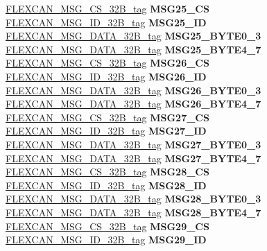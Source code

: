 \begin{DoxyCompactItemize}
\begin{tabbing}
\>\>\mbox{\hyperlink{unionFLEXCAN__MSG__CS__32B__tag}{FLEXCAN\_MSG\_CS\_32B\_tag}} {\bfseries MSG25\_CS}\\
\>\>\mbox{\hyperlink{unionFLEXCAN__MSG__ID__32B__tag}{FLEXCAN\_MSG\_ID\_32B\_tag}} {\bfseries MSG25\_ID}\\
\>\>\mbox{\hyperlink{unionFLEXCAN__MSG__DATA__32B__tag}{FLEXCAN\_MSG\_DATA\_32B\_tag}} {\bfseries MSG25\_BYTE0\_3}\\
\>\>\mbox{\hyperlink{unionFLEXCAN__MSG__DATA__32B__tag}{FLEXCAN\_MSG\_DATA\_32B\_tag}} {\bfseries MSG25\_BYTE4\_7}\\
\>\>\mbox{\hyperlink{unionFLEXCAN__MSG__CS__32B__tag}{FLEXCAN\_MSG\_CS\_32B\_tag}} {\bfseries MSG26\_CS}\\
\>\>\mbox{\hyperlink{unionFLEXCAN__MSG__ID__32B__tag}{FLEXCAN\_MSG\_ID\_32B\_tag}} {\bfseries MSG26\_ID}\\
\>\>\mbox{\hyperlink{unionFLEXCAN__MSG__DATA__32B__tag}{FLEXCAN\_MSG\_DATA\_32B\_tag}} {\bfseries MSG26\_BYTE0\_3}\\
\>\>\mbox{\hyperlink{unionFLEXCAN__MSG__DATA__32B__tag}{FLEXCAN\_MSG\_DATA\_32B\_tag}} {\bfseries MSG26\_BYTE4\_7}\\
\>\>\mbox{\hyperlink{unionFLEXCAN__MSG__CS__32B__tag}{FLEXCAN\_MSG\_CS\_32B\_tag}} {\bfseries MSG27\_CS}\\
\>\>\mbox{\hyperlink{unionFLEXCAN__MSG__ID__32B__tag}{FLEXCAN\_MSG\_ID\_32B\_tag}} {\bfseries MSG27\_ID}\\
\>\>\mbox{\hyperlink{unionFLEXCAN__MSG__DATA__32B__tag}{FLEXCAN\_MSG\_DATA\_32B\_tag}} {\bfseries MSG27\_BYTE0\_3}\\
\>\>\mbox{\hyperlink{unionFLEXCAN__MSG__DATA__32B__tag}{FLEXCAN\_MSG\_DATA\_32B\_tag}} {\bfseries MSG27\_BYTE4\_7}\\
\>\>\mbox{\hyperlink{unionFLEXCAN__MSG__CS__32B__tag}{FLEXCAN\_MSG\_CS\_32B\_tag}} {\bfseries MSG28\_CS}\\
\>\>\mbox{\hyperlink{unionFLEXCAN__MSG__ID__32B__tag}{FLEXCAN\_MSG\_ID\_32B\_tag}} {\bfseries MSG28\_ID}\\
\>\>\mbox{\hyperlink{unionFLEXCAN__MSG__DATA__32B__tag}{FLEXCAN\_MSG\_DATA\_32B\_tag}} {\bfseries MSG28\_BYTE0\_3}\\
\>\>\mbox{\hyperlink{unionFLEXCAN__MSG__DATA__32B__tag}{FLEXCAN\_MSG\_DATA\_32B\_tag}} {\bfseries MSG28\_BYTE4\_7}\\
\>\>\mbox{\hyperlink{unionFLEXCAN__MSG__CS__32B__tag}{FLEXCAN\_MSG\_CS\_32B\_tag}} {\bfseries MSG29\_CS}\\
\>\>\mbox{\hyperlink{unionFLEXCAN__MSG__ID__32B__tag}{FLEXCAN\_MSG\_ID\_32B\_tag}} {\bfseries MSG29\_ID}\\

\end{tabbing}
\end{DoxyCompactItemize}
